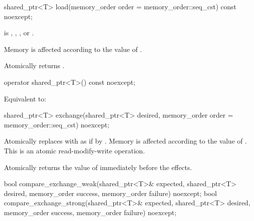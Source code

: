 %
\begin{itemdecl}
shared_ptr<T> load(memory_order order = memory_order::seq_cst) const noexcept;
\end{itemdecl}

\begin{itemdescr}
\pnum
\expects
{} is
,
,
, or
.

\pnum
\effects
Memory is affected according to the value of .

\pnum
\returns
Atomically returns .
\end{itemdescr}

%
\begin{itemdecl}
operator shared_ptr<T>() const noexcept;
\end{itemdecl}

\begin{itemdescr}
\pnum
\effects
Equivalent to: 
\end{itemdescr}

%
\begin{itemdecl}
shared_ptr<T> exchange(shared_ptr<T> desired, memory_order order = memory_order::seq_cst) noexcept;
\end{itemdecl}

\begin{itemdescr}
\pnum
\effects
Atomically replaces  with 
as if by .
Memory is affected according to the value of .
This is an atomic read-modify-write operation.

\pnum
\returns
Atomically returns the value of  immediately before the effects.
\end{itemdescr}

%
%
\begin{itemdecl}
bool compare_exchange_weak(shared_ptr<T>& expected, shared_ptr<T> desired,
                           memory_order success, memory_order failure) noexcept;
bool compare_exchange_strong(shared_ptr<T>& expected, shared_ptr<T> desired,
                             memory_order success, memory_order failure) noexcept;
\end{itemdecl}

